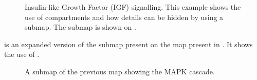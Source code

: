 \begin{figure}[t]
\begin{center}
\caption{Insulin-like Growth Factor (IGF) signalling. This example shows the use of compartments and how details can be hidden by using a submap. The submap is shown on .}
\label{fig:insulin}
\end{center}
\end{figure}

 is an expanded version of the submap present on the map present in . It shows the use of .

\begin{figure}[b]
\begin{center}
\caption{A submap of the previous map showing the MAPK cascade.}
\label{fig:mapk}
\end{center}
\end{figure}

